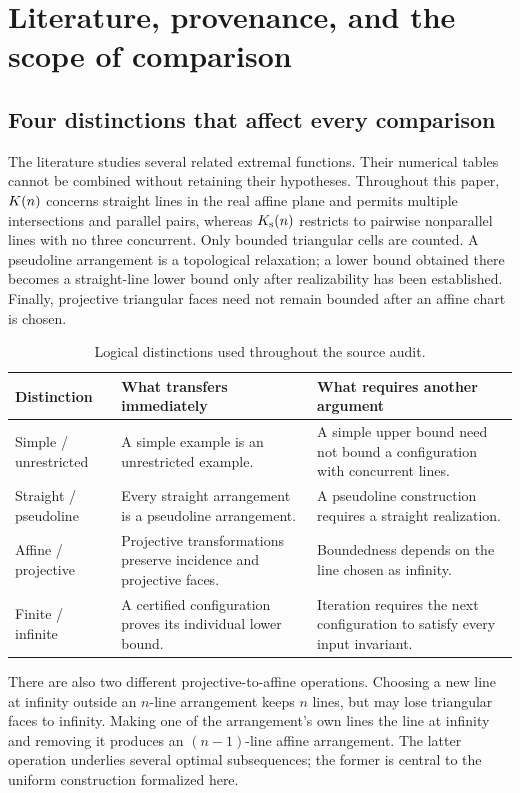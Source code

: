 \section{Literature, provenance, and the scope of comparison}
\label{lit:review}

\subsection{Four distinctions that affect every comparison}

The literature studies several related extremal functions. Their numerical tables cannot be combined without retaining their hypotheses. Throughout this paper, $K(n)$ concerns straight lines in the real affine plane and permits multiple intersections and parallel pairs, whereas $K_{\mathrm{s}}(n)$ restricts to pairwise nonparallel lines with no three concurrent. Only bounded triangular cells are counted. A pseudoline arrangement is a topological relaxation; a lower bound obtained there becomes a straight-line lower bound only after realizability has been established. Finally, projective triangular faces need not remain bounded after an affine chart is chosen.

\begin{table}[htbp]
\centering\small
\begin{tabularx}{\textwidth}{@{}lXX@{}}
\toprule
Distinction & What transfers immediately & What requires another argument\\
\midrule
Simple / unrestricted & A simple example is an unrestricted example. & A simple upper bound need not bound a configuration with concurrent lines.\\
Straight / pseudoline & Every straight arrangement is a pseudoline arrangement. & A pseudoline construction requires a straight realization.\\
Affine / projective & Projective transformations preserve incidence and projective faces. & Boundedness depends on the line chosen as infinity.\\
Finite / infinite & A certified configuration proves its individual lower bound. & Iteration requires the next configuration to satisfy every input invariant.\\
\bottomrule
\end{tabularx}
\caption{Logical distinctions used throughout the source audit.}
\label{lit:scope-table}
\end{table}

There are also two different projective-to-affine operations. Choosing a new line at infinity outside an $n$-line arrangement keeps $n$ lines, but may lose triangular faces to infinity. Making one of the arrangement's own lines the line at infinity and removing it produces an $(n-1)$-line affine arrangement. The latter operation underlies several optimal subsequences; the former is central to the uniform construction formalized here.

